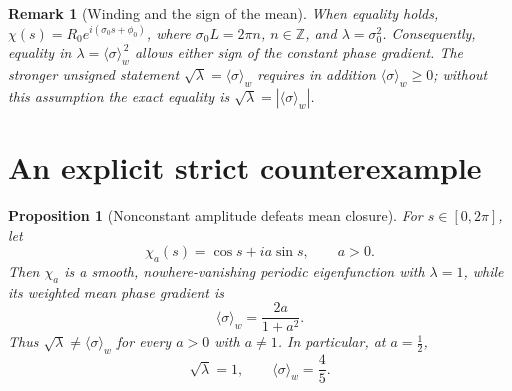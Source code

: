 \documentclass[11pt]{article}
\newtheorem{proposition}{Proposition}
\newtheorem{remark}{Remark}
\newcommand{\avg}[1]{\langle #1\rangle_w}
\begin{document}
\begin{remark}[Winding and the sign of the mean]
When equality holds, $\chi(s)=R_0e^{i(\sigma_0s+\phi_0)}$, where
$\sigma_0L=2\pi n$, $n\in\mathbb{Z}$, and
$\lambda=\sigma_0^2$.  Consequently, equality in
$\lambda=\avg{\sigma}^{\,2}$ allows either sign of the constant
phase gradient.  The stronger unsigned statement
$\sqrt{\lambda}=\avg{\sigma}$ requires in addition
$\avg{\sigma}\ge0$; without this assumption the exact equality is
$\sqrt{\lambda}=|\avg{\sigma}|$.
\end{remark}

\section{An explicit strict counterexample}

\begin{proposition}[Nonconstant amplitude defeats mean closure]
\label{prop:example}
For $s\in[0,2\pi]$, let
\begin{equation}\label{eq:example}
    \chi_a(s)=\cos s+ia\sin s,\qquad a>0.
\end{equation}
Then $\chi_a$ is a smooth, nowhere-vanishing periodic eigenfunction
with $\lambda=1$, while its weighted mean phase gradient is
\begin{equation}\label{eq:generalmean}
    \avg{\sigma}=\frac{2a}{1+a^2}.
\end{equation}
Thus $\sqrt{\lambda}\ne\avg{\sigma}$ for every $a>0$ with
$a\ne1$.  In particular, at $a=\tfrac12$,
\begin{equation}\label{eq:fourfifths}
    \boxed{\sqrt{\lambda}=1,\qquad\avg{\sigma}=\frac45.}
\end{equation}
\end{proposition}
\end{document}
